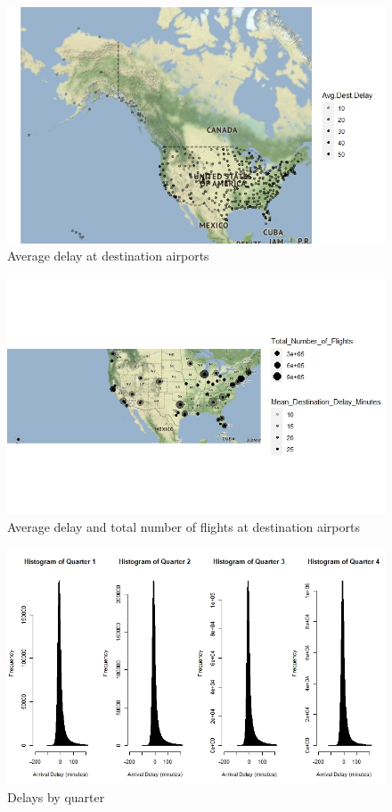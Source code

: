 \documentclass[12pt, a4paper, openany]{book}
\begin{document}
			\begin{figure}[h]
			\centering
	 		\includegraphics[width = 1 \textwidth]{../figures/PLOTS FOR REPORT/Chapter 4/Figure 4.22}
	 		\caption{Average delay at destination airports}
	 		\end{figure}


			\begin{figure}[h]
			\centering
	 		\includegraphics[width = 1\textwidth]{../figures/PLOTS FOR REPORT/Chapter 4/Figure 4.23}
	 		\caption{Average delay and total number of flights at destination airports}
	 		\end{figure}

			\begin{figure}[h]
			\centering
	 		\includegraphics[width = 1 \textwidth]{../figures/PLOTS FOR REPORT/Chapter 4/Figure 4.31}
	 		\caption{Delays by quarter}
	 		\end{figure}
\end{document}
